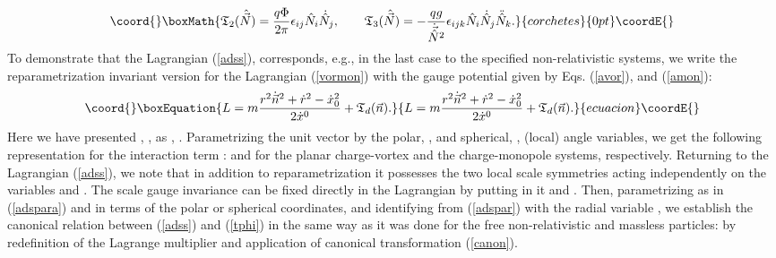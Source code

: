 \documentclass[a4paper,12pt]{article}
\def\X{\mathfrak X}
\begin{document}
\[\coord{}\boxMath{
{\mathfrak T}_2(\hat {\vec N})=
\frac{q\Phi}{2\pi}\epsilon_{ij}\hat N_i\dot{\hat N}_j,\qquad
{\mathfrak T}_3(\hat {\vec N})=-\frac{qg}{\dot{\vec{\hat
N}}{}^2}
\epsilon_{ijk}\hat N_i
\dot{\hat N}_j\ddot{\hat N}_k.
}{corchetes}{0pt}\coordE{}\]
To demonstrate that
the Lagrangian (\ref{adss}), corresponds, e.g.,
in the last case to
the specified non-relativistic systems,
we write the
reparametrization invariant version
for the Lagrangian (\ref{vormon})
with the gauge potential given by Eqs.
(\ref{avor}),
and (\ref{amon}):
\begin{equation}\coord{}\boxEquation{
L=m\frac{r^2\dot{\vec n}^2+
\dot{r}^2-\dot{x}_0^2}{2\dot{x}{}^0}+
{\mathfrak T}_d(\vec n).
\label{tphi}
}{
L=m\frac{r^2\dot{\vec n}^2+
\dot{r}^2-\dot{x}_0^2}{2\dot{x}{}^0}+
{\mathfrak T}_d(\vec n).
}{ecuacion}\coordE{}\end{equation}
Here we have presented \coordHE{},
\coordHE{},
as \coordHE{},
\coordHE{}.
Parametrizing the
unit vector \coordHE{} by the polar,
\coordHE{},
and spherical,
\coordHE{},
(local) angle variables,
we get the following representation for
the interaction term \coordHE{}:
\coordHE{}
and  \coordHE{}
for the planar charge-vortex
and the
\coordHE{} charge-monopole systems, respectively.
Returning to
the Lagrangian (\ref{adss}),
we note that in addition to
reparametrization it possesses the
two local scale symmetries
acting independently on the variables \myHighlight{$\X_A$}\coordHE{} and \coordHE{}.
The scale gauge invariance can be fixed
directly in the Lagrangian
by putting in it \myHighlight{$\X^2=-R^2$}\coordHE{} and \coordHE{}.
Then,  parametrizing \myHighlight{$\X_A$}\coordHE{} as in
(\ref{adspara}) and \coordHE{} in terms of
the polar or spherical coordinates,
and identifying
\coordHE{} from (\ref{adspar})
with the radial variable \coordHE{},
we establish the canonical relation
between (\ref{adss})
and (\ref{tphi}) in the same way
as it was done for the free non-relativistic
and massless particles:
by redefinition of the Lagrange multiplier
and  application of canonical transformation (\ref{canon}).
\end{document}
